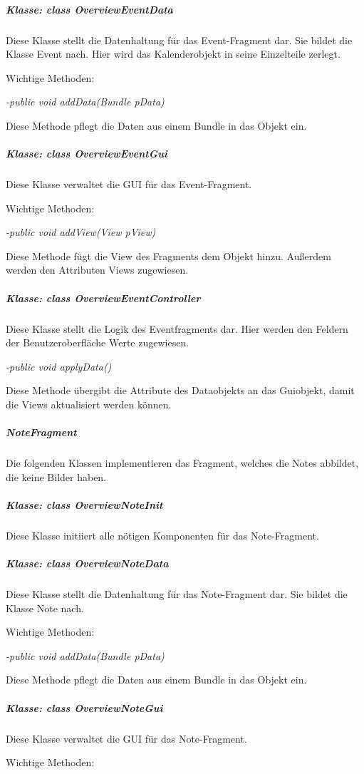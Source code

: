 \subparagraph*{Klasse: class OverviewEventData}

Diese Klasse stellt die Datenhaltung für das Event-Fragment dar. Sie bildet die Klasse Event nach. Hier wird das Kalenderobjekt in seine Einzelteile zerlegt.

Wichtige Methoden:

\textit{-public void addData(Bundle pData)}

Diese Methode pflegt die Daten aus einem Bundle in das Objekt ein.

\subparagraph*{Klasse: class OverviewEventGui}

Diese Klasse verwaltet die GUI für das Event-Fragment.

Wichtige Methoden:

\textit{-public void addView(View pView)}

Diese Methode fügt die View des Fragments dem Objekt hinzu. Außerdem werden den Attributen Views zugewiesen.

\subparagraph*{Klasse: class OverviewEventController}

Diese Klasse stellt die Logik des Eventfragments dar. Hier werden den Feldern der Benutzeroberfläche Werte zugewiesen.

\textit{-public void applyData()}

Diese Methode übergibt die Attribute des Dataobjekts an das Guiobjekt, damit die Views aktualisiert werden können.

\subparagraph{NoteFragment}

Die folgenden Klassen implementieren das Fragment, welches die Notes abbildet, die keine Bilder haben.

\subparagraph*{Klasse: class OverviewNoteInit}

Diese Klasse initiiert alle nötigen Komponenten für das Note-Fragment.

\subparagraph*{Klasse: class OverviewNoteData}

Diese Klasse stellt die Datenhaltung für das Note-Fragment dar. Sie bildet die Klasse Note nach.

Wichtige Methoden:

\textit{-public void addData(Bundle pData)}

Diese Methode pflegt die Daten aus einem Bundle in das Objekt ein.

\subparagraph*{Klasse: class OverviewNoteGui}

Diese Klasse verwaltet die GUI für das Note-Fragment.

Wichtige Methoden:

